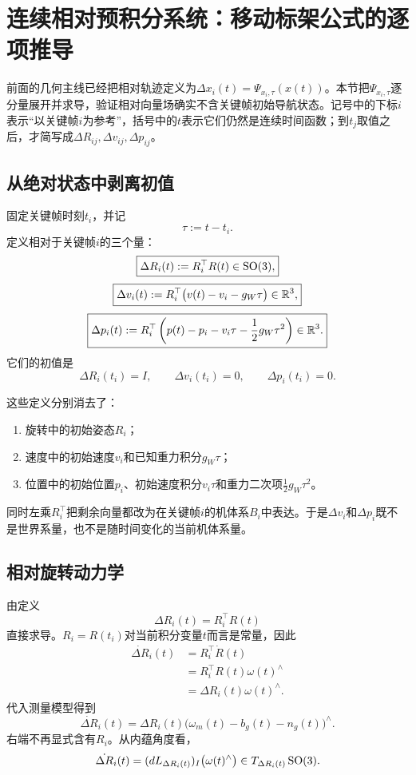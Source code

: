 
\section{连续相对预积分系统：移动标架公式的逐项推导}

前面的几何主线已经把相对轨迹定义为$\Delta x_i(t)=\Psi_{x_i,\tau}(x(t))$。本节把$\Psi_{x_i,\tau}$逐分量展开并求导，验证相对向量场确实不含关键帧初始导航状态。记号中的下标$i$表示“以关键帧$i$为参考”，括号中的$t$表示它们仍然是连续时间函数；到$t_j$取值之后，才简写成$\Delta R_{ij},\Delta v_{ij},\Delta p_{ij}$。

\subsection{从绝对状态中剥离初值}

固定关键帧时刻$t_i$，并记
\[
    \tau:=t-t_i.
\]
定义相对于关键帧$i$的三个量：
\[
\boxed{
    \Delta R_i(t):=R_i^\top R(t)\in\operatorname{SO}(3),
}
\]
\[
\boxed{
    \Delta v_i(t)
    :=R_i^\top\bigl(v(t)-v_i-g_W\tau\bigr)
    \in\mathbb{R}^3,
}
\]
\[
\boxed{
    \Delta p_i(t)
    :=R_i^\top
    \left(
        p(t)-p_i-v_i\tau-\frac12g_W\tau^2
    \right)
    \in\mathbb{R}^3.
}
\]
它们的初值是
\[
    \Delta R_i(t_i)=I,
    \qquad
    \Delta v_i(t_i)=0,
    \qquad
    \Delta p_i(t_i)=0.
\]

这些定义分别消去了：
\begin{enumerate}
    \item 旋转中的初始姿态$R_i$；
    \item 速度中的初始速度$v_i$和已知重力积分$g_W\tau$；
    \item 位置中的初始位置$p_i$、初始速度积分$v_i\tau$和重力二次项$\frac12g_W\tau^2$。
\end{enumerate}
同时左乘$R_i^\top$把剩余向量都改为在关键帧$i$的机体系$B_i$中表达。于是$\Delta v_i$和$\Delta p_i$既不是世界系量，也不是随时间变化的当前机体系量。

\subsection{相对旋转动力学}

由定义
\[
    \Delta R_i(t)=R_i^\top R(t)
\]
直接求导。$R_i=R(t_i)$对当前积分变量$t$而言是常量，因此
\[
\begin{aligned}
    \dot{\Delta R}_i(t)
    &=R_i^\top\dot R(t)\\
    &=R_i^\top R(t)\omega(t)^\wedge\\
    &=\Delta R_i(t)\omega(t)^\wedge.
\end{aligned}
\]
代入测量模型得到
\[
\boxed{
    \dot{\Delta R}_i(t)
    =\Delta R_i(t)
    \bigl(\omega_m(t)-b_g(t)-n_g(t)\bigr)^\wedge.
}
\]
右端不再显式含有$R_i$。从内蕴角度看，
\[
    \dot{\Delta R}_i(t)
    =(dL_{\Delta R_i(t)})_I
    \bigl(\omega(t)^\wedge\bigr)
    \in T_{\Delta R_i(t)}\operatorname{SO}(3).
\]

